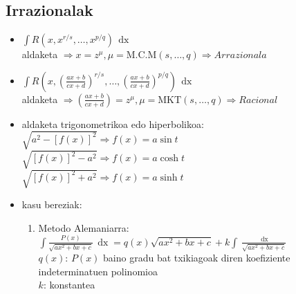 \documentclass[8pt]{article}
\DeclareMathOperator{\xder}{\, \mathrm{d}x}
\begin{document}
	\subsection{Irrazionalak}
		\begin{itemize}
			\item $ \int R (x, x^{r/s}, \dots , x^{p/q}) \xder $\\
				aldaketa $ \Rightarrow x = z^{\mu},
				\mu = \text{M.C.M} (s, \dots, q) \Rightarrow Arrazionala $
			\item $ \int R (x, (\frac{ax+b}{cx+d})^{r/s}, \dots, 
				(\frac{ax+b}{cx+d})^{p/q}) \xder $\\
				aldaketa $ \Rightarrow (\frac{ax+b}{cx+d}) = z^{\mu},
				\mu = \text{MKT} (s, \dots, q) \Rightarrow Racional $
			\item aldaketa trigonometrikoa edo hiperbolikoa:\\
				$ \sqrt{a^2 - [f(x)]^2} \Rightarrow f(x) = a \sin t $\\
				$ \sqrt{[f(x)]^2 - a^2} \Rightarrow f(x) = a \cosh t $\\
				$ \sqrt{[f(x)]^2 + a^2} \Rightarrow f(x) = a \sinh t $
			\item kasu bereziak:
				\begin{enumerate}
					\item Metodo Alemaniarra:
						$ \int \frac{P(x)}{\sqrt{a x^2 + bx + c}} \xder =
						q(x) \sqrt{a x^2 + bx + c} + k \int \frac{\xder}{\sqrt{a x^2 + bx + c}} $\\

						$ q(x) $: $ P(x) $ baino gradu bat txikiagoak diren
						koefiziente indeterminatuen polinomioa\\
						$ k $: konstantea
							

\end{enumerate}
\end{itemize}
\end{document}
